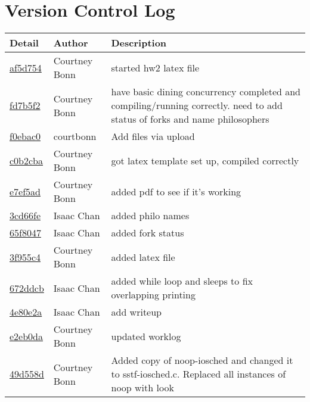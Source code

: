 \documentclass[letterpaper,10pt,draftclsnofoot,onecolumn,titlepage]{IEEEtran}
\begin{document}
\section{Version Control Log}
\begin{tabular}{p{2cm} p{3cm} p{12cm}}\textbf{Detail} & \textbf{Author} & \textbf{Description}\\\hline
\href{https://github.com/courtbonn/CS-444/commit/af5d754ea19c6bdc6fb977d874932a62b5176beb}{af5d754} & Courtney Bonn & started hw2 latex file\\\hline
\href{https://github.com/courtbonn/CS-444/commit/fd7b5f2f08a4033193091a2c005324d4e8c83dad}{fd7b5f2} & Courtney Bonn & have basic dining concurrency completed and compiling/running correctly. need to add status of forks and name philosophers\\\hline
\href{https://github.com/courtbonn/CS-444/commit/f0ebac09ef7efebaa007d5d0335d6622f2d72c31}{f0ebac0} & courtbonn & Add files via upload\\\hline
\href{https://github.com/courtbonn/CS-444/commit/c0b2cba2793c2b835c345de95d1adc408d3590a8}{c0b2cba} & Courtney Bonn & got latex template set up, compiled correctly\\\hline
\href{https://github.com/courtbonn/CS-444/commit/e7ef5ade60f7075aff7ea7a35a0a7576ad37fbb0}{e7ef5ad} & Courtney Bonn & added pdf to see if it's working\\\hline
\href{https://github.com/courtbonn/CS-444/commit/3cd66fe985151af1a961c9a1510d90d5906b56b5}{3cd66fe} & Isaac Chan & added philo names\\\hline
\href{https://github.com/courtbonn/CS-444/commit/65f8047ce747c6c81206c1b4b7e687d9eb404386}{65f8047} & Isaac Chan & added fork status\\\hline
\href{https://github.com/courtbonn/CS-444/commit/3f955c4d2095239ff38e446b64420fbad1581329}{3f955c4} & Courtney Bonn & added latex file\\\hline
\href{https://github.com/courtbonn/CS-444/commit/672ddcb03b3772fe388444afa3ef9f497483dab5}{672ddcb} & Isaac Chan & added while loop and sleeps to fix overlapping printing\\\hline
\href{https://github.com/courtbonn/CS-444/commit/4e80e2ae4644e5814c5c5ab02280c36ff4fb7cd1}{4e80e2a} & Isaac Chan & add writeup\\\hline
\href{https://github.com/courtbonn/CS-444/commit/e2eb0dad4d249310f06385038a952f71a68c356a}{e2eb0da} & Courtney Bonn & updated worklog\\\hline
\href{https://github.com/courtbonn/CS-444/commit/49d558d3f3bae0525a168a7cb1f950dc5d4df2c4}{49d558d} & Courtney Bonn & Added copy of noop-iosched and changed it to sstf-iosched.c. Replaced all instances of noop with look\\\hline

\end{tabular}
\end{document}
